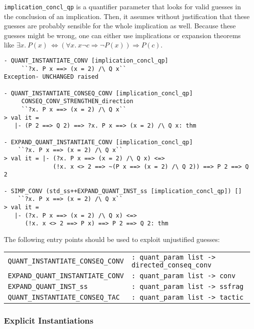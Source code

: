 \texttt{implication\_concl\_qp} is a quantifier parameter that looks for valid guesses in the conclusion of an implication. 
Then, it assumes without justification that these guesses are probably sensible for the whole implication as well. 
Because these guesses might be wrong, one can either use implications or
expansion theorems like $\exists x.\ P(x)\ \Longleftrightarrow (\forall x.\ x \neg c \Rightarrow \neg P(x)) \Rightarrow P(c)$.

\begin{session}
\begin{verbatim}
- QUANT_INSTANTIATE_CONV [implication_concl_qp] 
     ``?x. P x ==> (x = 2) /\ Q x``
Exception- UNCHANGED raised

- QUANT_INSTANTIATE_CONSEQ_CONV [implication_concl_qp] 
     CONSEQ_CONV_STRENGTHEN_direction 
     ``?x. P x ==> (x = 2) /\ Q x``
> val it =
   |- (P 2 ==> Q 2) ==> ?x. P x ==> (x = 2) /\ Q x: thm

- EXPAND_QUANT_INSTANTIATE_CONV [implication_concl_qp] 
    ``?x. P x ==> (x = 2) /\ Q x``
> val it = |- (?x. P x ==> (x = 2) /\ Q x) <=>
              (!x. x <> 2 ==> ~(P x ==> (x = 2) /\ Q 2)) ==> P 2 ==> Q 2

- SIMP_CONV (std_ss++EXPAND_QUANT_INST_ss [implication_concl_qp]) [] 
    ``?x. P x ==> (x = 2) /\ Q x``
> val it =
   |- (?x. P x ==> (x = 2) /\ Q x) <=> 
      (!x. x <> 2 ==> P x) ==> P 2 ==> Q 2: thm
\end{verbatim}
\end{session}

The following entry points should be used to exploit unjustified guesses:
\bigskip

\noindent
\begin{tabular}{@{}ll}
\texttt{QUANT\_INSTANTIATE\_CONSEQ\_CONV} & \texttt{: quant\_param list -> directed\_conseq\_conv} \\
\texttt{EXPAND\_QUANT\_INSTANTIATE\_CONV} & \texttt{: quant\_param list -> conv} \\
\texttt{EXPAND\_QUANT\_INST\_ss} & \texttt{: quant\_param list -> ssfrag} \\
\texttt{QUANT\_INSTANTIATE\_CONSEQ\_TAC} & \texttt{: quant\_param list -> tactic} 
\end{tabular}


\subsubsection{Explicit Instantiations}

